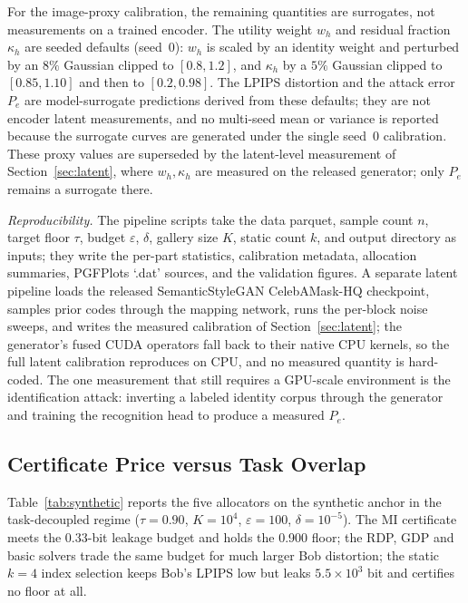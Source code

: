 \documentclass[10pt,twocolumn,letterpaper]{article}
\theoremstyle{plain}
\theoremstyle{definition}
\begin{document}
For the image-proxy calibration, the remaining quantities are surrogates, not
measurements on a trained encoder. The utility weight $w_h$ and residual
fraction $\kappa_h$ are seeded defaults (seed~0): $w_h$ is scaled by an
identity weight and perturbed by an $8\%$ Gaussian clipped to $[0.8,1.2]$, and
$\kappa_h$ by a $5\%$ Gaussian clipped to $[0.85,1.10]$ and then to
$[0.2,0.98]$. The LPIPS distortion and the attack error $P_e$ are
model-surrogate predictions derived from these defaults; they are not encoder
latent measurements, and no multi-seed mean or variance is reported because
the surrogate curves are generated under the single seed~0 calibration. These
proxy values are superseded by the latent-level measurement of
Section~\ref{sec:latent}, where $w_h,\kappa_h$ are measured on the released
generator; only $P_e$ remains a surrogate there.

\emph{Reproducibility.} The pipeline scripts take the data parquet, sample
count $n$, target floor $\tau$, budget $\varepsilon$, $\delta$, gallery size
$K$, static count $k$, and output directory as inputs; they write the per-part
statistics, calibration metadata, allocation summaries, PGFPlots `.dat'
sources, and the validation figures. A separate latent pipeline loads the
released SemanticStyleGAN CelebAMask-HQ checkpoint, samples prior codes through
the mapping network, runs the per-block noise sweeps, and writes the measured
calibration of Section~\ref{sec:latent}; the generator's fused CUDA operators
fall back to their native CPU kernels, so the full latent calibration
reproduces on CPU, and no measured quantity is hard-coded. The one measurement
that still requires a GPU-scale environment is the identification attack:
inverting a labeled identity corpus through the generator and training the
recognition head to produce a measured $P_e$.

\subsection{Certificate Price versus Task Overlap}

Table~\ref{tab:synthetic} reports the five allocators on the synthetic anchor
in the task-decoupled regime ($\tau=0.90$, $K=10^{4}$, $\varepsilon=100$,
$\delta=10^{-5}$). The MI certificate meets the 0.33-bit leakage budget and
holds the 0.900 floor; the RDP, GDP and basic solvers trade the same budget
for much larger Bob distortion; the static $k=4$ index selection keeps Bob's
LPIPS low but leaks $5.5\times10^{3}$ bit and certifies no floor at all.
\end{document}
